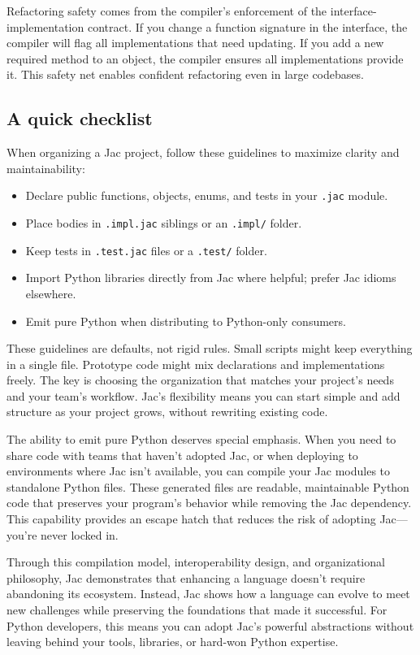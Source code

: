 Refactoring safety comes from the compiler's enforcement of the interface-implementation contract. If you change a function signature in the interface, the compiler will flag all implementations that need updating. If you add a new required method to an object, the compiler ensures all implementations provide it. This safety net enables confident refactoring even in large codebases.

\subsection*{A quick checklist}

When organizing a Jac project, follow these guidelines to maximize clarity and maintainability:

\begin{itemize}
    \item Declare public functions, objects, enums, and tests in your \texttt{.jac} module.
    \item Place bodies in \texttt{.impl.jac} siblings or an \texttt{.impl/} folder.
    \item Keep tests in \texttt{.test.jac} files or a \texttt{.test/} folder.
    \item Import Python libraries directly from Jac where helpful; prefer Jac idioms elsewhere.
    \item Emit pure Python when distributing to Python-only consumers.
\end{itemize}

These guidelines are defaults, not rigid rules. Small scripts might keep everything in a single file. Prototype code might mix declarations and implementations freely. The key is choosing the organization that matches your project's needs and your team's workflow. Jac's flexibility means you can start simple and add structure as your project grows, without rewriting existing code.

The ability to emit pure Python deserves special emphasis. When you need to share code with teams that haven't adopted Jac, or when deploying to environments where Jac isn't available, you can compile your Jac modules to standalone Python files. These generated files are readable, maintainable Python code that preserves your program's behavior while removing the Jac dependency. This capability provides an escape hatch that reduces the risk of adopting Jac—you're never locked in.

Through this compilation model, interoperability design, and organizational philosophy, Jac demonstrates that enhancing a language doesn't require abandoning its ecosystem. Instead, Jac shows how a language can evolve to meet new challenges while preserving the foundations that made it successful. For Python developers, this means you can adopt Jac's powerful abstractions without leaving behind your tools, libraries, or hard-won Python expertise.